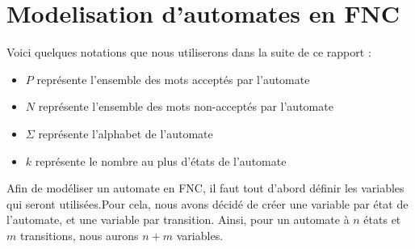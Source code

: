 \documentclass[a4paper, 12pt]{extarticle}
\begin{document}


\makemargins %
\makefrontpage


% 


\section{Modelisation d'automates en FNC} %
\label{sec:modelisation_d_automates_en_fnc_}


Voici quelques notations que nous utiliserons dans la suite de ce rapport : 
\begin{itemize}[label=$\bullet$]
    \item $P$ représente l'ensemble des mots acceptés par l'automate 
    \item $N$ représente l'ensemble des mots non-acceptés par l'automate 
    \item $\Sigma$ représente l'alphabet de l'automate 
    \item $k$ représente le nombre au plus d'états de l'automate
\end{itemize}

\noindent Afin de modéliser un automate en FNC, il faut tout d'abord définir les variables qui seront 
utilisées.Pour cela, nous avons décidé de créer une variable par état de l'automate, et une 
variable par transition. Ainsi, pour un automate à $n$ états et $m$ transitions, nous aurons 
$n+m$ variables. 
\end{document}
